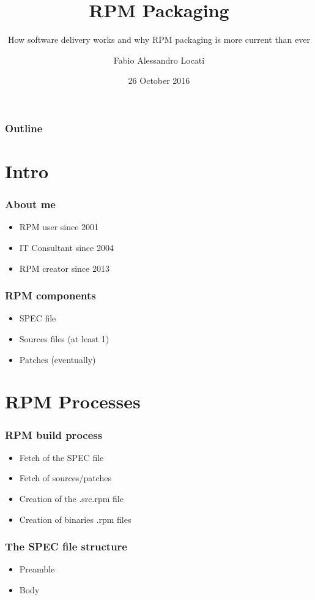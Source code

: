 \documentclass[t,aspectratio=169]{beamer}
\title{RPM Packaging}
\subtitle{How software delivery works and why RPM packaging is more current than ever}
\author{Fabio Alessandro Locati}
\date{26 October 2016}
\begin{document}
\maketitle

\begin{frame}
    \frametitle{Outline}
    \tableofcontents
\end{frame}

\section{Intro}
\begin{frame}
    \frametitle{About me}
    \begin{itemize}
        \item<2-> RPM user since 2001
        \item<3-> IT Consultant since 2004
        \item<4-> RPM creator since 2013
    \end{itemize}
\end{frame}

\begin{frame}
    \frametitle{RPM components}
    \begin{itemize}
        \item<2-> SPEC file
        \item<3-> Sources files (at least 1)
        \item<4-> Patches (eventually)
    \end{itemize}
\end{frame}

\section{RPM Processes}
\begin{frame}
    \frametitle{RPM build process}
    \begin{itemize}
        \item<2-> Fetch of the SPEC file
        \item<3-> Fetch of sources/patches
        \item<4-> Creation of the .src.rpm file
        \item<5-> Creation of binaries .rpm files
    \end{itemize}
\end{frame}

\begin{frame}
    \frametitle{The SPEC file structure}
    \begin{itemize}
        \item<2-> Preamble
        \item<3-> Body
    \end{itemize}
\end{frame}
\end{document}
